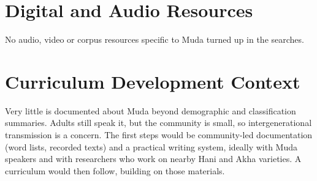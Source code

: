 \documentclass[12pt]{article}
\begin{document}
\section{Digital and Audio Resources}
No audio, video or corpus resources specific to Muda turned up in the searches.

\section{Curriculum Development Context}
Very little is documented about Muda beyond demographic and classification summaries. Adults still speak it, but the community is small, so intergenerational transmission is a concern. The first steps would be community-led documentation (word lists, recorded texts) and a practical writing system, ideally with Muda speakers and with researchers who work on nearby Hani and Akha varieties. A curriculum would then follow, building on those materials.
\end{document}
